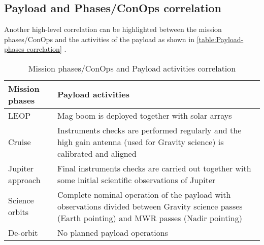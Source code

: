 \subsection{Payload and Phases/ConOps correlation}
Another high-level correlation can be highlighted between the mission phases/ConOps and the activities of the payload as shown in \autoref*{table:Payload-phases correlation} \cite{Juno_launch}.

\begin{table}[H]
    \renewcommand{\arraystretch}{1.5}
    \centering
    \begin{tabularx}{\linewidth}{|X|X|}
        \hline
        \textbf{Mission phases} & \textbf{Payload activities} \\
        \hline
        \hline
        LEOP & Mag boom is deployed together with solar arrays \\
        \hline
        Cruise & Instruments checks are performed regularly and the high gain antenna (used for Gravity science) is calibrated and aligned \\
        \hline
        Jupiter approach & Final instruments checks are carried out together with some initial scientific observations of Jupiter \\
        \hline
        Science orbits & Complete nominal operation of the payload with observations divided between Gravity science passes (Earth pointing) and MWR passes (Nadir pointing) \\
        \hline
        De-orbit & No planned payload operations \\
        \hline
    \end{tabularx}
    \caption{Mission phases/ConOps and Payload activities correlation}
    \label{table:Payload-phases correlation}
\end{table}